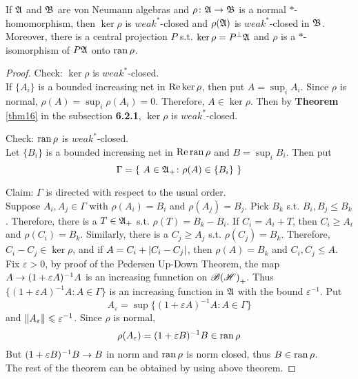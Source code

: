 \begin{thm}
	If $\mathfrak{A}$ and $\mathfrak{B}$ are von Neumann algebras and $\rho \colon \mathfrak{A} \rightarrow \mathfrak{B}$ is a normal $*$-homomorphism, then $\ker{\rho}$ is $weak^*$-closed and $\rho(\mathfrak{A})$ is $weak^*$-closed in $\mathfrak{B}$. Moreover, there is a central projection $P$ s.t. $\ker{\rho} =  P^{\bot} \mathfrak{A}$ and $\rho$  is a $*$-isomorphism of $P \mathfrak{A}$ onto $\operatorname{ran}{\rho}$.
\end{thm}
\begin{proof}
	Check: $\ker{\rho}$ is $weak^*$-closed. \\
	If $\{A_i\}$ is a bounded increasing net in $\operatorname{Re}{\ker{\rho}}$, then put $A = \sup_i A_i$. Since $\rho$ is normal, $\rho(A) = \sup_i \rho(A_i) = 0$. Therefore, $A \in \ker{\rho}$. Then by \textbf{Theorem} \ref{thm16} in the subsection \textbf{6.2.1}, $\ker{\rho}$ is $weak^*$-closed.
	\item Check: $\operatorname{ran}{\rho}$ is $weak^*$-closed. \\
	Let $\{B_i\}$ is a bounded increasing net in $\operatorname{Re}{\operatorname{ran}{\rho}}$ and $B = \sup_i B_i$. Then put
	\begin{equation*}
		\Gamma = \{~A \in \mathfrak{A}_+ \colon \rho(A) \in \{B_i\}~\}
	\end{equation*}
	\item Claim: $\Gamma$ is directed with respect to the usual order. \\
	Suppose $A_i, A_j \in \Gamma$ with $\rho(A_i) = B_i$ and $\rho(A_j)  = B_j$. Pick $B_k$ s.t. $B_i, B_j \leqslant B_k$. Therefore, there is a $T \in \mathfrak{A}_+$ s.t. $\rho(T) = B_k-B_i$. If $C_i =  A_i + T$, then $C_i \geqslant A_i$ and $\rho(C_i) = B_k$. Similarly, there is a $C_j \geqslant A_j$ s.t. $\rho(C_j) = B_k$. Therefore, $C_i-C_j \in \ker{\rho}$, and if $A = C_i + \left\lvert C_i-C_j\right\lvert$, then $\rho(A) = B_k$ and $C_i, C_j \leqslant A$. \\
	Fix $\varepsilon > 0$, by proof of the Pedersen Up-Down Theorem, the map  $A  \rightarrow (1+\varepsilon A)^{-1}A$ is an increasing funnction on $\mathscr{B(H)}_+$. Thus $\{(1+\varepsilon A)^{-1}A \colon A \in \Gamma\}$ is an increasing function in $\mathfrak{A}$ with the bound $\varepsilon^{-1}$. Put
	\begin{equation*}
		A_{\varepsilon}  = \sup{\{(1+\varepsilon A)^{-1}A \colon A \in \Gamma\}}
	\end{equation*}
	and $\left\lVert A_{\varepsilon}\right\lVert \leqslant \varepsilon^{-1}$. Since $\rho$ is normal,
	\begin{equation*}
		\rho(A_\varepsilon) = (1+\varepsilon B)^{-1}B \in \operatorname{ran}{\rho}
	\end{equation*}
	But $(1+\varepsilon B)^{-1}B \rightarrow B$ in norm and $\operatorname{ran}{\rho}$ is norm closed, thus $B \in \operatorname{ran}{\rho}$.  \\
	The rest of the theorem can be obtained by using above theorem.
\end{proof}

